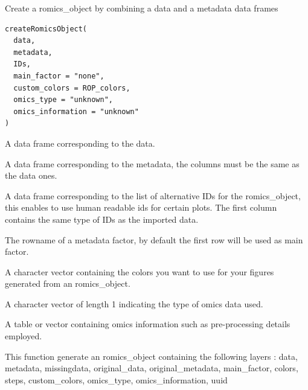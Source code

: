 \documentclass[a4paper]{book}
\begin{document}
%
\begin{Description}
Create a romics\_object by combining a data and a metadata data frames
\end{Description}
%
\begin{Usage}
\begin{verbatim}
createRomicsObject(
  data,
  metadata,
  IDs,
  main_factor = "none",
  custom_colors = ROP_colors,
  omics_type = "unknown",
  omics_information = "unknown"
)
\end{verbatim}
\end{Usage}
%
\begin{Arguments}
\begin{ldescription}
\item[\code{data}] A data frame corresponding to the data.

\item[\code{metadata}] A data frame corresponding to the metadata, the columns must be the same as the data ones.

\item[\code{IDs}] A data frame corresponding to the list of alternative IDs for the romics\_object, this enables to use human readable ids for certain plots. The first column contains the same type of IDs as the imported data.

\item[\code{main\_factor}] The rowname of a metadata factor, by default the first row will be used as main factor.

\item[\code{custom\_colors}] A character vector containing the colors you want to use for your figures generated from an romics\_object.

\item[\code{omics\_type}] A character vector of length 1 indicating the type of omics data used.

\item[\code{omics\_information}] A table or vector containing omics information such as pre-processing details employed.
\end{ldescription}
\end{Arguments}
%
\begin{Value}
This function generate an romics\_object containing the following layers : data, metadata, missingdata, original\_data, original\_metadata, main\_factor, colors, steps, custom\_colors, omics\_type, omics\_information, uuid
\end{Value}
\end{document}
